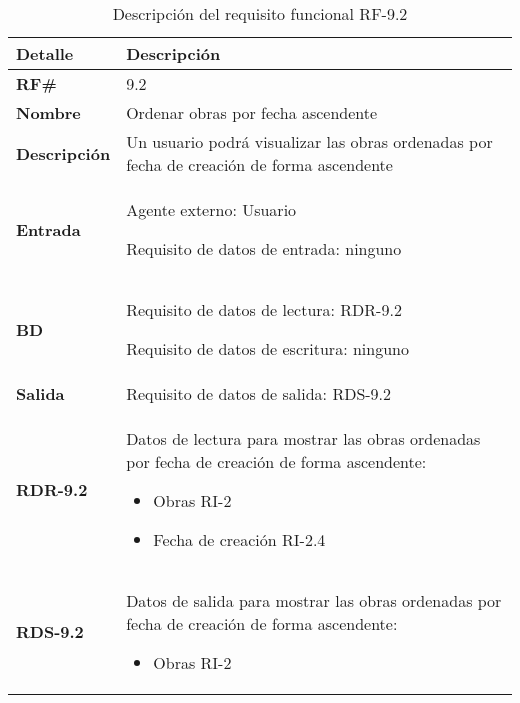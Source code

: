 \begin{table}[H]
    \centering
    \begin{tabular}{|p{3cm}|p{8cm}|}
        \hline
        \rowcolor{lightgray}
        \textbf{Detalle} & \textbf{Descripción} \\
        \hline
        \textbf{RF\#} & 9.2 \\
        \hline
        \textbf{Nombre} & Ordenar obras por fecha ascendente \\
        \hline
        \textbf{Descripción} & Un usuario podrá visualizar las obras ordenadas
        por fecha de creación de forma ascendente \\
        \hline
        \textbf{Entrada} &
        Agente externo: Usuario
        
        Requisito de datos de entrada: ninguno \\
        \hline
        \textbf{BD} &
        Requisito de datos de lectura: RDR-9.2
        
        Requisito de datos de escritura: ninguno \\
        \hline
        \textbf{Salida} & Requisito de datos de salida: RDS-9.2 \\
        \hline
        \textbf{RDR-9.2} & Datos de lectura para mostrar las obras ordenadas por fecha
        de creación de forma ascendente:
            \begin{itemize}
                \item Obras RI-2
                \item Fecha de creación RI-2.4
            \end{itemize} \\
        \hline
        \textbf{RDS-9.2} & Datos de salida para mostrar las obras ordenadas por fecha
        de creación de forma ascendente:
            \begin{itemize}
                \item Obras RI-2
            \end{itemize} \\
        \hline
    \end{tabular}
    \caption{Descripción del requisito funcional RF-9.2}
    \label{tab:rf-9-2}
\end{table}

